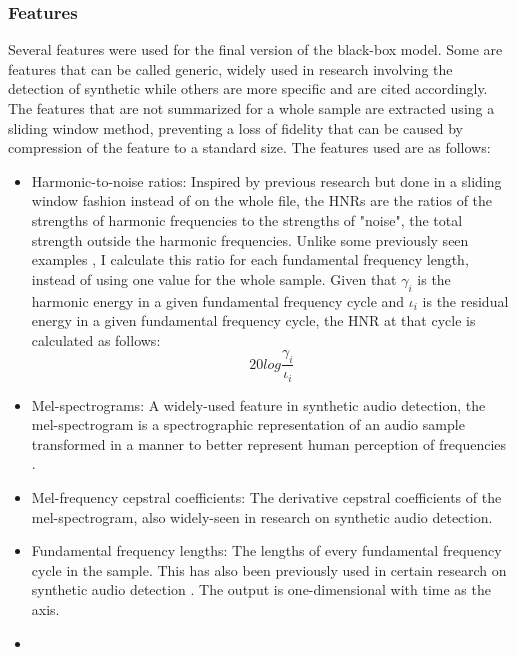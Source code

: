 \documentclass{article}
\begin{document}
			\subsubsection{Features}
			Several features were used for the final version of the black-box model. Some are
			features that can be called generic, widely used in research involving the detection
			of synthetic while others are more specific and are cited accordingly. The features
			that are not summarized for a whole sample are extracted using a sliding window method,
			preventing a loss of fidelity that can be caused by compression of the feature to a
			standard size. The features used are as follows:
			\begin{itemize}
				\item
					\sloppy
					Harmonic-to-noise ratios: Inspired by previous research
					\cite{chaiwongyen_contribution_2022,chaiwongyen_deepfake-speech_2023,
					li_comparative_2022} but done in a sliding window fashion instead of on the
					whole file, the HNRs are the ratios of the strengths of harmonic frequencies
					to the strengths of "noise", the total strength outside the harmonic
					frequencies. Unlike some previously seen examples
					\cite{chaiwongyen_contribution_2022, chaiwongyen_deepfake-speech_2023}, I
					calculate this ratio for each fundamental frequency length, instead of using
					one value for the whole sample. Given that \(\gamma_{i}\) is the harmonic
					energy in a given fundamental frequency cycle and \(\iota_{i}\) is the
					residual energy in a given fundamental frequency cycle, the HNR at that cycle
					is calculated as follows:
					\[ 20log\frac{\gamma_{i}}{\iota_{i}} \]
				\item
					Mel-spectrograms: A widely-used feature in synthetic audio detection, the
					mel-spectrogram is a spectrographic representation of an audio sample
					transformed in a manner to better represent human perception of frequencies
					\cite{qais_deepfake_2022}.
				\item
					Mel-frequency cepstral coefficients: The derivative cepstral coefficients of
					the mel-spectrogram, also widely-seen in research on synthetic audio detection.
				\item
					Fundamental frequency lengths: The lengths of every fundamental frequency
					cycle in the sample. This has also been previously used in certain research on
					synthetic audio detection \cite{xue_audio_2022}. The output is one-dimensional
					with time as the axis.
				\item

\end{itemize}
\end{document}
